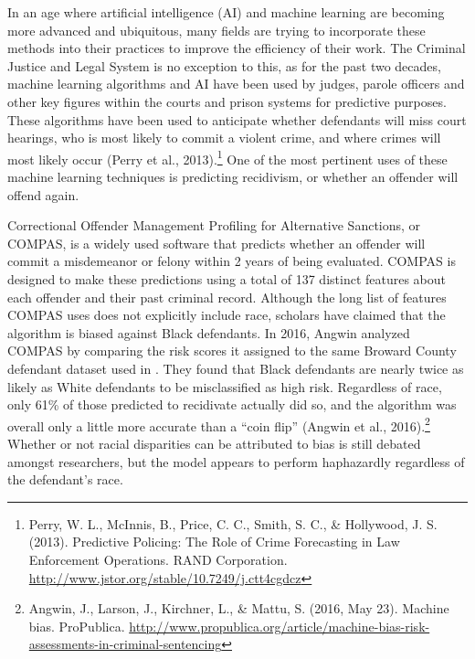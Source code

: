 \documentclass[12pt, ]{article}
\begin{document}
In an age where artificial intelligence (AI) and machine learning are
becoming more advanced and ubiquitous, many fields are trying to
incorporate these methods into their practices to improve the efficiency
of their work. The Criminal Justice and Legal System is no exception to
this, as for the past two decades, machine learning algorithms and AI
have been used by judges, parole officers and other key figures within
the courts and prison systems for predictive purposes. These algorithms
have been used to anticipate whether defendants will miss court
hearings, who is most likely to commit a violent crime, and where crimes
will most likely occur (Perry et al., 2013).\footnote{Perry, W. L.,
  McInnis, B., Price, C. C., Smith, S. C., \& Hollywood, J. S. (2013).
  Predictive Policing: The Role of Crime Forecasting in Law Enforcement
  Operations. RAND Corporation.
  \url{http://www.jstor.org/stable/10.7249/j.ctt4cgdcz}} One of the most
pertinent uses of these machine learning techniques is predicting
recidivism, or whether an offender will offend again.

Correctional Offender Management Profiling for Alternative Sanctions, or
COMPAS, is a widely used software that predicts whether an offender will
commit a misdemeanor or felony within 2 years of being evaluated. COMPAS
is designed to make these predictions using a total of 137 distinct
features about each offender and their past criminal record. Although
the long list of features COMPAS uses does not explicitly include race,
scholars have claimed that the algorithm is biased against Black
defendants. In 2016, Angwin analyzed COMPAS by comparing the risk scores
it assigned to the same Broward County defendant dataset used in
\citep{dressel2018accuracy}. They found that Black defendants are nearly
twice as likely as White defendants to be misclassified as high risk.
Regardless of race, only 61\% of those predicted to recidivate actually
did so, and the algorithm was overall only a little more accurate than a
``coin flip'' (Angwin et al., 2016).\footnote{Angwin, J., Larson, J.,
  Kirchner, L., \& Mattu, S. (2016, May 23). Machine bias. ProPublica.
  \url{http://www.propublica.org/article/machine-bias-risk-assessments-in-criminal-sentencing}}
Whether or not racial disparities can be attributed to bias is still
debated amongst researchers, but the model appears to perform
haphazardly regardless of the defendant's race.
\end{document}
